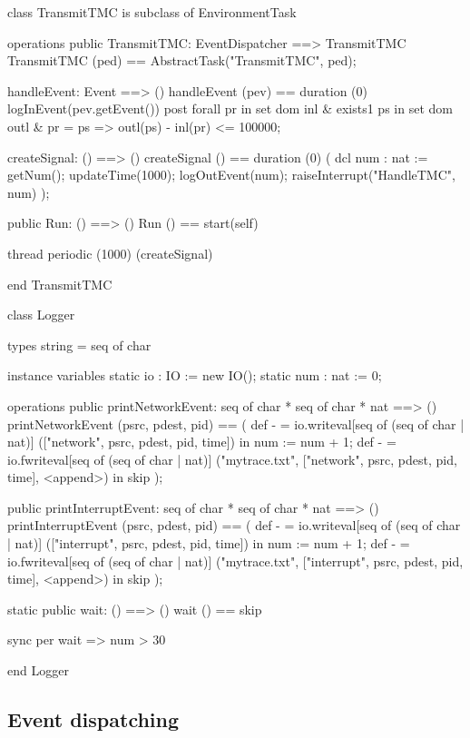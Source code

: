 \begin{vdm_al}
class TransmitTMC
  is subclass of EnvironmentTask

operations
  public TransmitTMC: EventDispatcher ==> TransmitTMC
  TransmitTMC (ped) == AbstractTask("TransmitTMC", ped);

  handleEvent: Event ==> ()
  handleEvent (pev) == duration (0) logInEvent(pev.getEvent())
  post forall pr in set dom inl &
         exists1 ps in set dom outl &
           pr = ps => outl(ps) - inl(pr) <= 100000;

  createSignal: () ==> ()
  createSignal () ==
    duration (0)
      ( dcl num : nat := getNum();
	updateTime(1000);
	logOutEvent(num);
        raiseInterrupt("HandleTMC", num) );

  public Run: () ==> ()
  Run () == start(self)

thread
  periodic (1000) (createSignal)

end TransmitTMC
\end{vdm_al}

\begin{vdm_al}
class Logger

types
  string = seq of char

instance variables
  static io : IO := new IO();
  static num : nat := 0;

operations
  public printNetworkEvent: seq of char * seq of char * nat ==> ()
  printNetworkEvent (psrc, pdest, pid) ==
    ( def - = io.writeval[seq of (seq of char | nat)]
        (["network", psrc, pdest, pid, time]) in num := num + 1;
      def - = io.fwriteval[seq of (seq of char | nat)]
        ("mytrace.txt", ["network", psrc, pdest, pid, time], <append>) in skip );

  public printInterruptEvent: seq of char * seq of char * nat ==> ()
  printInterruptEvent (psrc, pdest, pid) ==
    ( def - = io.writeval[seq of (seq of char | nat)]
        (["interrupt", psrc, pdest, pid, time]) in num := num + 1;
      def - = io.fwriteval[seq of (seq of char | nat)]
        ("mytrace.txt", ["interrupt", psrc, pdest, pid, time], <append>) in skip );

  static public wait: () ==> ()
  wait () == skip
    
sync
  per wait => num > 30

end Logger
\end{vdm_al}

\subsection{Event dispatching}


